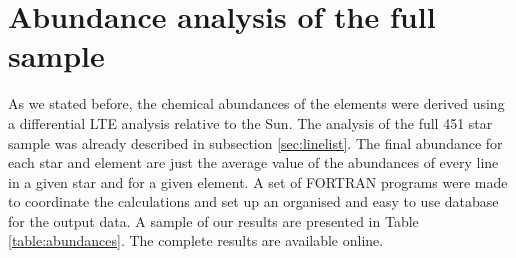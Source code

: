 \documentclass[oldversion]{aa}
\begin{document}
\section{Abundance analysis of the full sample}
\label{sec:abundance}

As we stated before, the chemical abundances of the elements were derived using a differential LTE analysis relative to the Sun. The analysis of the full 451 star sample was already described in subsection \ref{sec:linelist}. The final abundance for each star and element are just the average value of the abundances of every line in a given star and for a given element. A set of FORTRAN programs were made to coordinate the calculations and set up an organised and easy to use database for the output data. A sample of our results are presented in Table \ref{table:abundances}. The complete results are available online.
\end{document}
